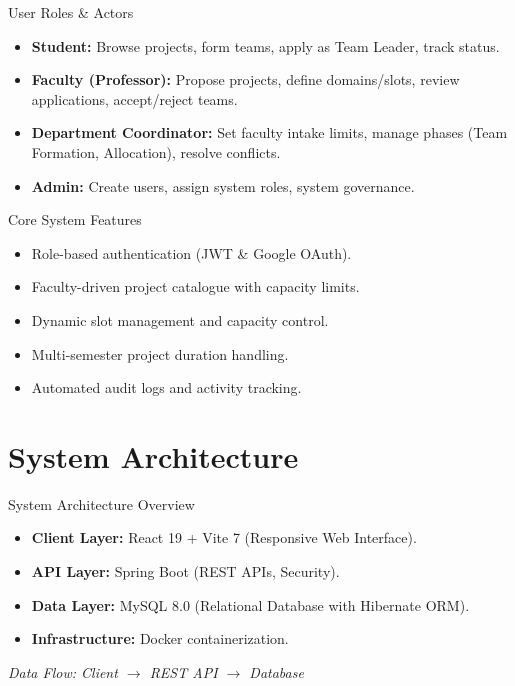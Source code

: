 \documentclass[aspectratio=169]{beamer}
\begin{document}
\begin{frame}{User Roles \& Actors}
    \begin{itemize}
        \item \textbf{Student:} Browse projects, form teams, apply as Team Leader, track status.
        \item \textbf{Faculty (Professor):} Propose projects, define domains/slots, review applications, accept/reject teams.
        \item \textbf{Department Coordinator:} Set faculty intake limits, manage phases (Team Formation, Allocation), resolve conflicts.
        \item \textbf{Admin:} Create users, assign system roles, system governance.
    \end{itemize}
\end{frame}

\begin{frame}{Core System Features}
    \begin{itemize}
        \item Role-based authentication (JWT \& Google OAuth).
        \item Faculty-driven project catalogue with capacity limits.
        \item Dynamic slot management and capacity control.
        \item Multi-semester project duration handling.
        \item Automated audit logs and activity tracking.
    \end{itemize}
\end{frame}

\section{System Architecture}

\begin{frame}{System Architecture Overview}
    \begin{itemize}
        \item \textbf{Client Layer:} React 19 + Vite 7 (Responsive Web Interface).
        \item \textbf{API Layer:} Spring Boot (REST APIs, Security).
        \item \textbf{Data Layer:} MySQL 8.0 (Relational Database with Hibernate ORM).
        \item \textbf{Infrastructure:} Docker containerization.
    \end{itemize}
    \vspace{0.5cm}
    \begin{center}
        \textit{Data Flow: Client $\rightarrow$ REST API $\rightarrow$ Database}
    \end{center}
\end{frame}
\end{document}
